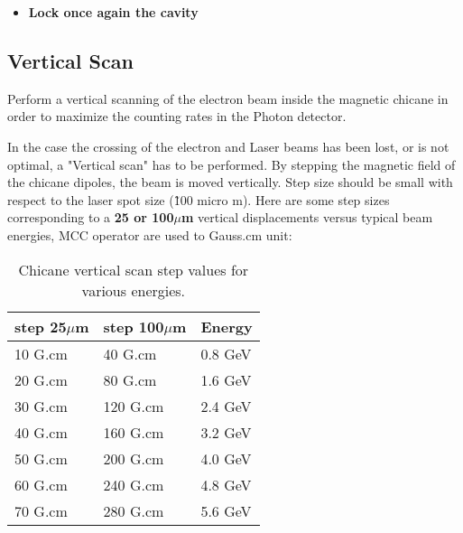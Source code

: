 {{\begin{itemize}
        This procedure is only performed by MCC operators.\\

        First of all,
        the Hall A Run Coordinator must request that
        MCC tune the beam through the Compton chicane.
        MCC operators have to apply the section 2 of
        the procedure MCC-PR-04-001. If necessary
       (after a long shutdown for example), let's remind to the operator
       to open valves located on the Compton line.
       The complete procedure is available on the MCC web site \\
\href{http://opsntsrv.acc.jlab.org/ops_docs/online_document_files/MCC_online_files/HallA_beam_delivery_proc.pdf}%
{ at this URL}
       
\item {\bf Lock once again the cavity}\\
\end{itemize}

\subsection{Vertical Scan}
Perform a vertical scanning of the electron beam inside the magnetic chicane 
in order to maximize the counting rates in the Photon detector.

        In the case the crossing of the electron and Laser beams
        has been lost, or is not optimal, a "Vertical scan" has to be performed.
        By stepping the magnetic field of the
        chicane dipoles, the beam is moved vertically. Step size should be
        small with respect to the laser spot size (\~100 micro m). Here are some
        step sizes corresponding to a {\bf 25 or 100$\mu$m  } vertical displacements versus
        typical beam energies, MCC operator are used to Gauss.cm unit:
\begin{table}[ht]
\begin{center}
\begin{tabular}{|l|l|l|} \hline
step 25$\mu$m & step 100$\mu$m & Energy \\ \hline\hline
10 G.cm & 40 G.cm & 0.8 GeV \\ \hline
20 G.cm &  80 G.cm &  1.6 GeV \\ \hline
30 G.cm &  120 G.cm & 2.4  GeV \\ \hline
40 G.cm &  160 G.cm & 3.2  GeV \\ \hline
50 G.cm &  200 G.cm & 4.0  GeV \\ \hline
60 G.cm &  240 G.cm &  4.8 GeV \\ \hline
70 G.cm &  280 G.cm &  5.6 GeV \\ \hline 
\end{tabular}
\end{center}
\caption[Compton:vertical scan]{Chicane vertical scan step values for various energies.
}
\label{tab:compton_vscan}
\end{table}
	
}}
